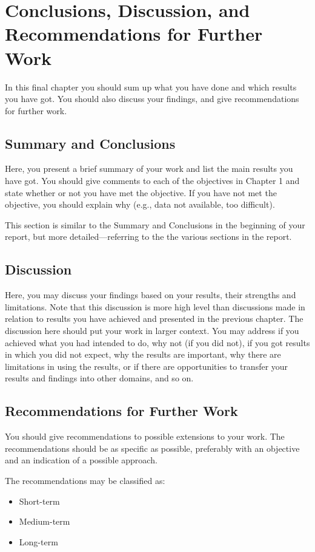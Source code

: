 \documentclass[thesis.tex]{subfiles}
\begin{document}
\chapter[Conclusions]{Conclusions, Discussion, and Recommendations for Further Work}
\label{ch:conclusions}
In this final chapter you should sum up what you have done and which results you have got. 
You should also discuss your findings, and give recommendations for further work.

\section{Summary and Conclusions}
\label{sec:summary_and_conclusions}
Here, you present a brief summary of your work and list the main results you have got. 
You should give comments to each of the objectives in Chapter 1 and state whether or not you have met the objective. 
If you have not met the objective, you should explain why (e.g., data not available, too difficult).

This section is similar to the Summary and Conclusions in the beginning of your report, but more detailed---referring to the the various sections in the report.

\section{Discussion}
\label{sec:discussion}
Here, you may discuss your findings based on your results, their strengths and limitations. 
Note that this discussion is more high level than discussions made in relation to results you have achieved and presented in the previous chapter. 
The discussion here should put your work in larger context. 
You may address if you achieved what you had intended to do, why not (if you did not), if you got results in which you did not expect, why the results are important, why there are limitations in using the results, or if there are opportunities to transfer your results and findings into other domains, and so on.
\section{Recommendations for Further Work}
\label{sec:recommendations_for_further_work}
You should give recommendations to possible extensions to your work. 
The recommendations should be as specific as possible, preferably with an objective and an indication of a possible approach.

The recommendations may be classified as:
\begin{itemize}
\item Short-term
\item Medium-term
\item Long-term
\end{itemize}
\end{document}
